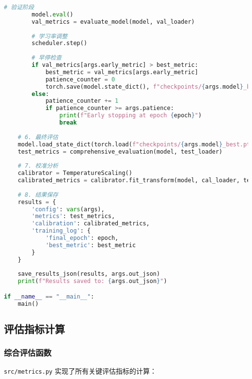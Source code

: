 \begin{lstlisting}[language=Python,caption=训练评估主程序结构]
        # 验证阶段
        model.eval()
        val_metrics = evaluate_model(model, val_loader)
        
        # 学习率调整
        scheduler.step()
        
        # 早停检查
        if val_metrics[args.early_metric] > best_metric:
            best_metric = val_metrics[args.early_metric]
            patience_counter = 0
            torch.save(model.state_dict(), f"checkpoints/{args.model}_best.pth")
        else:
            patience_counter += 1
            if patience_counter >= args.patience:
                print(f"Early stopping at epoch {epoch}")
                break
    
    # 6. 最终评估
    model.load_state_dict(torch.load(f"checkpoints/{args.model}_best.pth"))
    test_metrics = comprehensive_evaluation(model, test_loader)
    
    # 7. 校准分析
    calibrator = TemperatureScaling()
    calibrated_metrics = calibrator.fit_transform(model, cal_loader, test_loader)
    
    # 8. 结果保存
    results = {
        'config': vars(args),
        'metrics': test_metrics,
        'calibration': calibrated_metrics,
        'training_log': {
            'final_epoch': epoch,
            'best_metric': best_metric
        }
    }
    
    save_results_json(results, args.out_json)
    print(f"Results saved to: {args.out_json}")

if __name__ == "__main__":
    main()
\end{lstlisting}

\subsection{评估指标计算}
\label{subsec:metrics_implementation}

\subsubsection{综合评估函数}
\texttt{src/metrics.py} 实现了所有关键评估指标的计算：

